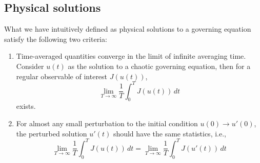 \subsection{Physical solutions}
What we have intuitively defined as physical solutions to a governing equation satisfy the following
two criteria: 
\begin{enumerate}
    \item Time-averaged quantities converge in the limit of infinite averaging time.
    Consider $u(t)$ as the solution to a chaotic governing equation, then for a regular observable
    of interest $J(u(t))$,
    \begin{equation} \label{longtimeavg}
        \lim_{T\to\infty}\frac1T \int_0^T J(u(t))\,dt
    \end{equation}
    exists.
    \item For almost any small perturbation to the initial condition $u(0)\to u'(0)$, the perturbed
    solution $u'(t)$ should have the same statistics, i.e.,
    \begin{equation}
        \lim_{T\to\infty}\frac1T \int_0^T J(u(t))\,dt
      = \lim_{T\to\infty}\frac1T \int_0^T J(u'(t))\,dt
    \end{equation}
\end{enumerate}

